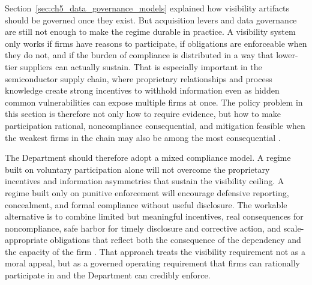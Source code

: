 Section~\ref{sec:ch5_data_governance_models} explained how visibility artifacts should be governed once they exist. But acquisition levers and data governance are still not enough to make the regime durable in practice. A visibility system only works if firms have reasons to participate, if obligations are enforceable when they do not, and if the burden of compliance is distributed in a way that lower-tier suppliers can actually sustain. That is especially important in the semiconductor supply chain, where proprietary relationships and process knowledge create strong incentives to withhold information even as hidden common vulnerabilities can expose multiple firms at once. The policy problem in this section is therefore not only how to require evidence, but how to make participation rational, noncompliance consequential, and mitigation feasible when the weakest firms in the chain may also be among the most consequential \parencite{ch5_nist800161r1upd1,ch5_dod2022_supplychains,U.S.GovernmentAccountabilityOffice2025}.

The Department should therefore adopt a mixed compliance model. A regime built on voluntary participation alone will not overcome the proprietary incentives and information asymmetries that sustain the visibility ceiling. A regime built only on punitive enforcement will encourage defensive reporting, concealment, and formal compliance without useful disclosure. The workable alternative is to combine limited but meaningful incentives, real consequences for noncompliance, safe harbor for timely disclosure and corrective action, and scale-appropriate obligations that reflect both the consequence of the dependency and the capacity of the firm \parencite{ch5_nist800161r1upd1,ch5_dod2022_supplychains,U.S.GovernmentAccountabilityOffice2025}. That approach treats the visibility requirement not as a moral appeal, but as a governed operating requirement that firms can rationally participate in and the Department can credibly enforce.

